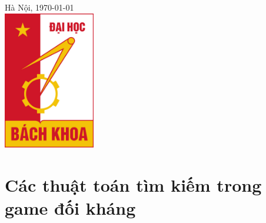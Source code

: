\documentclass[12pt]{report}
\begin{document}
\begin{titlepage}


{\large Hà Nội, \today}\\[1cm] %


\includegraphics[width=4cm]{hust.jpg}\\[1cm] %
 

\vfill %

\end{titlepage}

\tableofcontents 
\newpage

\newpage
\setcounter{page}{1}


\section{Các thuật toán tìm kiếm trong game đối kháng}
\end{document}
